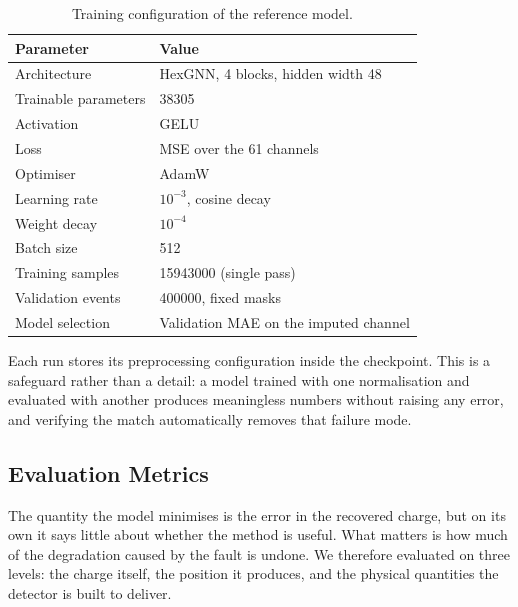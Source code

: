 \documentclass[10pt,conference]{IEEEtran}
\begin{document}
\begin{table}[t]
\centering
\caption{Training configuration of the reference model.}
\label{tab:hyperparams}
\begin{tabular}{@{}ll@{}}
\toprule
\textbf{Parameter} & \textbf{Value} \\
\midrule
Architecture        & HexGNN, 4 blocks, hidden width 48 \\
Trainable parameters & \num{38305} \\
Activation          & GELU \\
Loss                & MSE over the 61 channels \\
Optimiser           & AdamW \cite{loshchilov2019adamw} \\
Learning rate       & $10^{-3}$, cosine decay \cite{loshchilov2017sgdr} \\
Weight decay        & $10^{-4}$ \\
Batch size          & 512 \\
Training samples    & \num{15943000} (single pass) \\
Validation events   & \num{400000}, fixed masks \\
Model selection     & Validation MAE on the imputed channel \\
\bottomrule
\end{tabular}
\end{table}

Each run stores its preprocessing configuration inside the checkpoint. This is
a safeguard rather than a detail: a model trained with one normalisation and
evaluated with another produces meaningless numbers without raising any error,
and verifying the match automatically removes that failure mode.

\subsection{Evaluation Metrics}
\label{sec:metrics}

The quantity the model minimises is the error in the recovered charge, but on
its own it says little about whether the method is useful. What matters is how
much of the degradation caused by the fault is undone. We therefore evaluated
on three levels: the charge itself, the position it produces, and the physical
quantities the detector is built to deliver.
\end{document}
